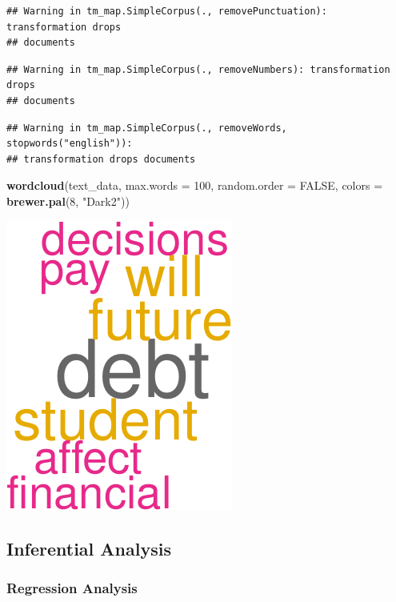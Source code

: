 \documentclass[
]{article}
\newenvironment{Shaded}{\begin{snugshade}}{\end{snugshade}}
\newcommand{\AttributeTok}[1]{\textcolor[rgb]{0.13,0.29,0.53}{#1}}
\newcommand{\ConstantTok}[1]{\textcolor[rgb]{0.56,0.35,0.01}{#1}}
\newcommand{\DecValTok}[1]{\textcolor[rgb]{0.00,0.00,0.81}{#1}}
\newcommand{\FunctionTok}[1]{\textcolor[rgb]{0.13,0.29,0.53}{\textbf{#1}}}
\newcommand{\NormalTok}[1]{#1}
\newcommand{\StringTok}[1]{\textcolor[rgb]{0.31,0.60,0.02}{#1}}
\begin{document}
\begin{verbatim}
## Warning in tm_map.SimpleCorpus(., removePunctuation): transformation drops
## documents
\end{verbatim}

\begin{verbatim}
## Warning in tm_map.SimpleCorpus(., removeNumbers): transformation drops
## documents
\end{verbatim}

\begin{verbatim}
## Warning in tm_map.SimpleCorpus(., removeWords, stopwords("english")):
## transformation drops documents
\end{verbatim}

\begin{Shaded}
\begin{Highlighting}[]
\FunctionTok{wordcloud}\NormalTok{(text\_data, }\AttributeTok{max.words =} \DecValTok{100}\NormalTok{, }\AttributeTok{random.order =} \ConstantTok{FALSE}\NormalTok{, }\AttributeTok{colors =} \FunctionTok{brewer.pal}\NormalTok{(}\DecValTok{8}\NormalTok{, }\StringTok{"Dark2"}\NormalTok{))}
\end{Highlighting}
\end{Shaded}

\includegraphics{Project1_files/figure-latex/unnamed-chunk-13-1.pdf}

\subsection{Inferential Analysis}\label{inferential-analysis}

\subsubsection{Regression Analysis}\label{regression-analysis}
\end{document}
